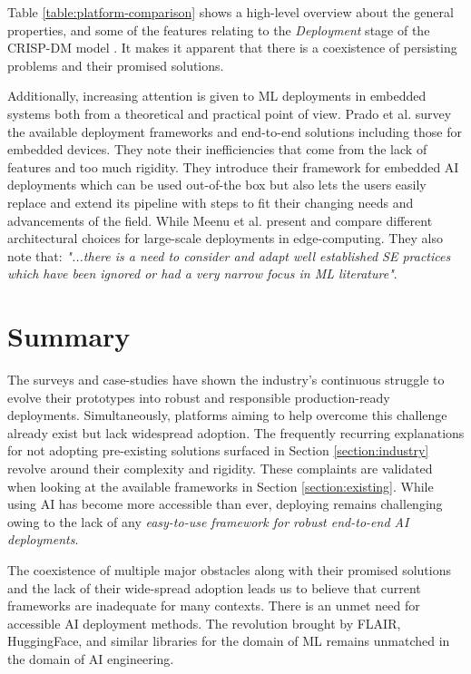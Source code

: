 Table \ref{table:platform-comparison} shows a high-level overview about the general properties, and some of the features relating to the \textit{Deployment} stage of the CRISP-DM model \cite{wirth2000crisp}. It makes it apparent that there is a coexistence of persisting problems and their promised solutions.

Additionally, increasing attention is given to ML deployments in embedded systems both from a theoretical \cite{john2020ai} and practical \cite{prado2020bonseyes} point of view. Prado et al. \cite{prado2020bonseyes} survey the available deployment frameworks and end-to-end solutions including those for embedded devices. They note their inefficiencies that come from the lack of features and too much rigidity. They introduce their framework for embedded AI deployments which can be used out-of-the box but also lets the users easily replace and extend its pipeline with steps to fit their changing needs and advancements of the field. While Meenu et al. \cite{john2020ai} present and compare different architectural choices for large-scale deployments in edge-computing. They also note that: \textit{"...there is a need to consider and adapt well established SE practices which have been ignored or had a very narrow focus in ML literature"}.

\section{Summary}

The surveys and case-studies have shown the industry's continuous struggle to evolve their prototypes into robust and responsible production-ready deployments. Simultaneously, platforms aiming to help overcome this challenge already exist but lack widespread adoption. The frequently recurring explanations for not adopting pre-existing solutions surfaced in Section \ref{section:industry} revolve around their complexity and rigidity. These complaints are validated when looking at the available frameworks in Section \ref{section:existing}. While using AI has become more accessible than ever, deploying remains challenging owing to the lack of any \textit{easy-to-use framework for robust end-to-end AI deployments}.

The coexistence of multiple major obstacles along with their promised solutions and the lack of their wide-spread adoption leads us to believe that current frameworks are inadequate for many contexts. There is an unmet need for accessible AI deployment methods. The revolution brought by FLAIR, HuggingFace, and similar libraries for the domain of ML remains unmatched in the domain of AI engineering.

